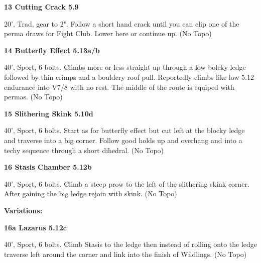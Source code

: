 \begin{multicols}{2}
\needspace{1.5cm}
\label{rt:Cutting Crack}
\colorbox{green!20}{
\parbox{0.95\linewidth}{
\textbf{
13 Cutting Crack 5.9  
}}}
\begin{adjustwidth}{0.5cm}{}			
20', Trad, gear to 2". Follow a short hand crack until you can clip one of the perma draws for Fight Club. Lower here or continue up.
  (No Topo)
\end{adjustwidth}




\needspace{1.5cm}
\label{rt:Butterfly Effect}
\colorbox{Goldenrod!50}{
\parbox{0.95\linewidth}{
\textbf{
14 Butterfly Effect 5.13a/b  
}}}
\begin{adjustwidth}{0.5cm}{}			
40', Sport, 6 bolts. Climbs more or less straight up through a low bolcky ledge followed by thin crimps and a bouldery roof pull. Reportedly climbs like low 5.12 endurance into V7/8 with no rest. The middle of the route is equiped with permas.
  (No Topo)
\end{adjustwidth}




\needspace{1.5cm}
\label{rt:Slithering Skink}
\colorbox{RoyalBlue!20}{
\parbox{0.95\linewidth}{
\textbf{
15 Slithering Skink 5.10d  
}}}
\begin{adjustwidth}{0.5cm}{}			
40', Sport, 6 bolts. Start as for butterfly effect but cut left at the blocky ledge and traverse into a big corner. Follow good holds up and overhang and into a techy sequence through a short dihedral.
  (No Topo)
\end{adjustwidth}




\needspace{1.5cm}
\label{rt:Stasis Chamber}
\colorbox{Goldenrod!50}{
\parbox{0.95\linewidth}{
\textbf{
16 Stasis Chamber 5.12b  
}}}
\begin{adjustwidth}{0.5cm}{}			
40', Sport, 6 bolts. Climb a steep prow to the left of the slithering skink corner. After gaining the big ledge rejoin with skink.
  (No Topo)
\end{adjustwidth}


\begin{adjustwidth}{0.5cm}{}				
\needspace{3cm}
\textbf{Variations:} \newline

\needspace{1.5cm}
\label{vr:Lazarus}
\colorbox{Goldenrod!50}{
\parbox{0.95\linewidth}{
\textbf{
16a Lazarus 5.12c  
}}}
\begin{adjustwidth}{0.5cm}{}			
40', Sport, 6 bolts. Climb Stasis to the ledge then instead of rolling onto the ledge traverse left around the corner and link into the finish of Wildlings.
  (No Topo)
\end{adjustwidth}




\end{adjustwidth}
\end{multicols}

